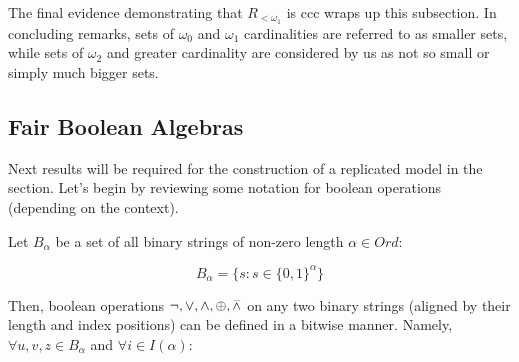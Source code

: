 The final evidence demonstrating that \( R_{<\omega_1} \) is ccc wraps up this subsection. In concluding remarks, sets of \( \omega_0 \) and \( \omega_1 \) cardinalities are referred to as smaller sets, while sets of \( \omega_2 \) and greater cardinality are considered by us as not so small or simply much bigger sets.

\subsection{Fair Boolean Algebras}

Next results will be required for the construction of a replicated model in the \textit{} section. Let's begin by reviewing some notation for boolean operations (depending on the context).

\begin{definition}\label{def_bw_ops}
  Let $B_\alpha$ be a set of all binary strings of non-zero length $\alpha \in Ord$:

    \[ B_\alpha = \{ s : s \in \{0,1\}^\alpha\}\]

  Then, boolean operations $\neg, \lor, \land, \oplus, \barwedge$ on any two binary strings (aligned by their length and index positions) can be defined in a bitwise manner. Namely, $\forall u,v,z \in B_\alpha$ and $\forall i \in I(\alpha)$: 


\end{definition}
